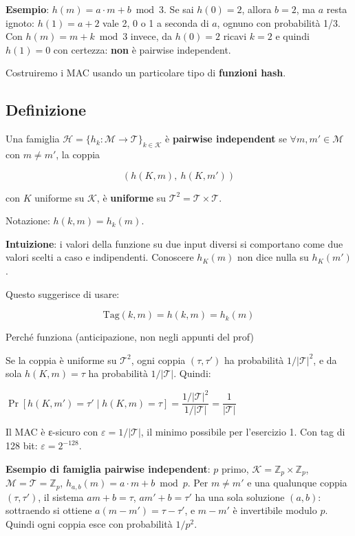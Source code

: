 \begin{esempio}

\textbf{Esempio}: \(h(m) = a \cdot m + b \bmod 3\). Se sai \(h(0) = 2\), allora \(b = 2\), ma \(a\) resta ignoto: \(h(1) = a + 2\) vale 2, 0 o 1 a seconda di \(a\), ognuno con probabilità 1/3. Con \(h(m) = m + k \bmod 3\) invece, da \(h(0) = 2\) ricavi \(k = 2\) e quindi \(h(1) = 0\) con certezza: \textbf{non} è pairwise independent.

\end{esempio}

Costruiremo i MAC usando un particolare tipo di \textbf{funzioni hash}.

\subsection{Definizione}

Una famiglia \(\mathcal{H} = \{h_k : \mathcal{M} \to \mathcal{T}\}_{k \in \mathcal{K}}\) è \textbf{pairwise independent} se \(\forall m, m' \in \mathcal{M}\) con \(m \ne m'\), la coppia

\[
(h(K, m),\ h(K, m'))
\]

con \(K\) uniforme su \(\mathcal{K}\), è \textbf{uniforme} su \(\mathcal{T}^2 = \mathcal{T} \times \mathcal{T}\).

Notazione: \(h(k, m) = h_k(m)\).

\textbf{Intuizione}: i valori della funzione su due input diversi si comportano come due valori scelti a caso e indipendenti. Conoscere \(h_K(m)\) non dice nulla su \(h_K(m')\).

Questo suggerisce di usare:

\[
\text{Tag}(k, m) = h(k, m) = h_k(m)
\]

\begin{approfondimento}{Perché funziona (anticipazione, non negli appunti del prof)}

Se la coppia è uniforme su \(\mathcal{T}^2\), ogni coppia \((\tau, \tau')\) ha probabilità \(1/|\mathcal{T}|^2\), e da sola \(h(K, m) = \tau\) ha probabilità \(1/|\mathcal{T}|\). Quindi:

\(\Pr[h(K, m') = \tau' \mid h(K, m) = \tau] = \dfrac{1/|\mathcal{T}|^2}{1/|\mathcal{T}|} = \dfrac{1}{|\mathcal{T}|}\)

Il MAC è ε-sicuro con \(\varepsilon = 1/|\mathcal{T}|\), il minimo possibile per l'esercizio 1. Con tag di 128 bit: \(\varepsilon = 2^{-128}\).

\textbf{Esempio di famiglia pairwise independent}: \(p\) primo, \(\mathcal{K} = \mathbb{Z}_p \times \mathbb{Z}_p\), \(\mathcal{M} = \mathcal{T} = \mathbb{Z}_p\), \(h_{a,b}(m) = a \cdot m + b \bmod p\). Per \(m \ne m'\) e una qualunque coppia \((\tau, \tau')\), il sistema \(a m + b = \tau\), \(a m' + b = \tau'\) ha una sola soluzione \((a, b)\): sottraendo si ottiene \(a(m - m') = \tau - \tau'\), e \(m - m'\) è invertibile modulo \(p\). Quindi ogni coppia esce con probabilità \(1/p^2\).

\end{approfondimento}

